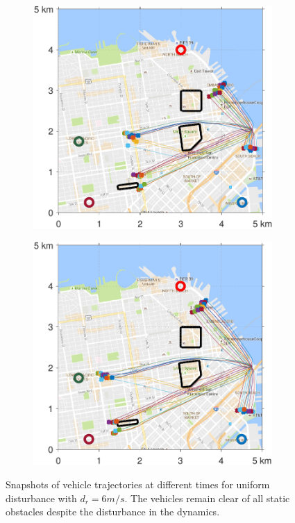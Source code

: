 \begin{figure}[!htb]
\begin{subfigure}{0.5\textwidth}
  \includegraphics[width=\columnwidth]{figs/sf_d6sep0_s3}
  \subcaption{}
  \label{fig:sf_d6sep0_s3}
\end{subfigure}%
\begin{subfigure}{0.5\textwidth}
  \includegraphics[width=\columnwidth]{figs/sf_d6sep0_s4}
  \subcaption{}
  \label{fig:sf_d6sep0_s4}
\end{subfigure}%
\caption{Snapshots of vehicle trajectories at different times for uniform disturbance with $d_{r} = 6 m/s$. The vehicles remain clear of all static obstacles despite the disturbance in the dynamics.}
\label{fig:trajectories_sf_snapshots}
\end{figure}

